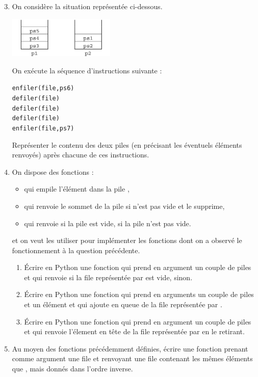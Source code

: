 \documentclass[11pt,a4paper,french,twoside]{PMCours}
\begin{document}
\newpage
\begin{enumerate}\setcounter{enumi}{2}
\item On considère la situation représentée ci-dessous.

\includegraphics[width=0.4\textwidth]{BacBlanc2Sujet2_NSI2122-img2.png}

On exécute la séquence d'instructions suivante :
\begin{alltt}
enfiler(file,ps6)
defiler(file)
defiler(file)
defiler(file)
enfiler(file,ps7)
\end{alltt}
Représenter le contenu des deux piles (en précisant les éventuels éléments renvoyés) après chacune de ces instructions. 
\item On dispose des fonctions :
\begin{itemize}
    \item {} qui empile l'élément  dans la pile ,
    \item {} qui renvoie le sommet de la pile  si  n'est pas vide et le
    supprime,
    \item {} qui renvoie  si la pile  est vide,  si la pile  n'est pas vide.
\end{itemize}
et on veut les utiliser pour implémenter les fonctions dont on a observé le fonctionnement à la question précédente. 
\begin{enumerate}
    \item Écrire en Python une fonction  qui prend en argument un couple de
    piles  et qui renvoie  si la file représentée par  est vide,  sinon.
    \item Écrire en Python une fonction  qui prend en arguments un couple de
    piles  et un élément  et qui ajoute  en queue de la file représentée par .
    \item Écrire en Python une fonction  qui prend en argument un couple de piles 
    et qui renvoie l'élement en tête de la file représentée par  en le retirant.
\end{enumerate}
\item Au moyen des fonctions précédemment définies, écrire une fonction prenant comme argument une file  et renvoyant une file contenant les mêmes éléments que , mais donnés dans l'ordre inverse. 
\end{enumerate}
\end{document}
